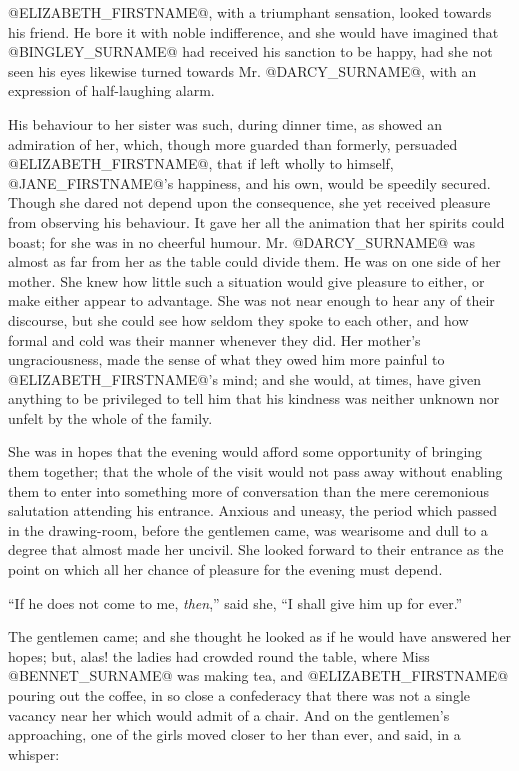 @ELIZABETH_FIRSTNAME@, with a triumphant sensation, looked towards his friend.
He bore it with noble indifference, and she would have imagined that
@BINGLEY_SURNAME@ had received his sanction to be happy, had she not seen his eyes
likewise turned towards Mr. @DARCY_SURNAME@, with an expression of half-laughing
alarm.

His behaviour to her sister was such, during dinner time, as showed an
admiration of her, which, though more guarded than formerly, persuaded
@ELIZABETH_FIRSTNAME@, that if left wholly to himself, @JANE_FIRSTNAME@'s happiness, and his
own, would be speedily secured. Though she dared not depend upon the
consequence, she yet received pleasure from observing his behaviour. It
gave her all the animation that her spirits could boast; for she was in
no cheerful humour. Mr. @DARCY_SURNAME@ was almost as far from her as the table
could divide them. He was on one side of her mother. She knew how little
such a situation would give pleasure to either, or make either appear to
advantage. She was not near enough to hear any of their discourse, but
she could see how seldom they spoke to each other, and how formal and
cold was their manner whenever they did. Her mother's ungraciousness,
made the sense of what they owed him more painful to @ELIZABETH_FIRSTNAME@'s mind;
and she would, at times, have given anything to be privileged to tell
him that his kindness was neither unknown nor unfelt by the whole of the
family.

She was in hopes that the evening would afford some opportunity of
bringing them together; that the whole of the visit would not pass away
without enabling them to enter into something more of conversation than
the mere ceremonious salutation attending his entrance. Anxious
and uneasy, the period which passed in the drawing-room, before the
gentlemen came, was wearisome and dull to a degree that almost made her
uncivil. She looked forward to their entrance as the point on which all
her chance of pleasure for the evening must depend.

``If he does not come to me, \textit{then},'' said she, ``I shall give him up for
ever.''

The gentlemen came; and she thought he looked as if he would have
answered her hopes; but, alas! the ladies had crowded round the table,
where Miss @BENNET_SURNAME@ was making tea, and @ELIZABETH_FIRSTNAME@ pouring out the coffee,
in so close a confederacy that there was not a single vacancy near her
which would admit of a chair. And on the gentlemen's approaching, one of
the girls moved closer to her than ever, and said, in a whisper:

